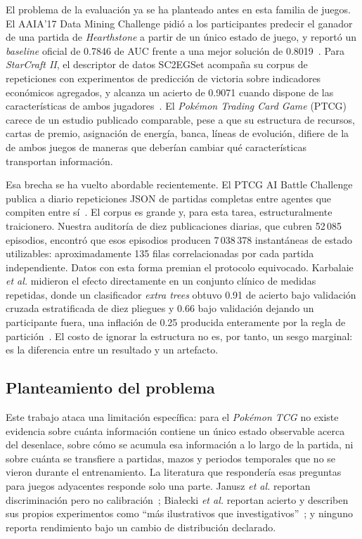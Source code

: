 \documentclass[conference]{IEEEtran}
\begin{document}
El problema de la evaluaci\'on ya se ha planteado antes en esta familia de
juegos. El AAIA'17 Data Mining Challenge pidi\'o a los participantes
predecir el ganador de una partida de \emph{Hearthstone} a partir de un
\'unico estado de juego, y report\'o un \emph{baseline} oficial de 0.7846
de AUC frente a una mejor soluci\'on de
0.8019~\cite{janusz_hearthstone_2017}. Para \emph{StarCraft II}, el
descriptor de datos SC2EGSet acompa\~na su corpus de repeticiones con
experimentos de predicci\'on de victoria sobre indicadores econ\'omicos
agregados, y alcanza un acierto de 0.9071 cuando dispone de las
caracter\'isticas de ambos jugadores~\cite{bialecki_sc2egset_2023}. El
\emph{Pok\'emon Trading Card Game} (PTCG) carece de un estudio publicado
comparable, pese a que su estructura de recursos, cartas de premio,
asignaci\'on de energ\'ia, banca, l\'ineas de evoluci\'on, difiere de la
de ambos juegos de maneras que deber\'ian cambiar qu\'e caracter\'isticas
transportan informaci\'on.

Esa brecha se ha vuelto abordable recientemente. El PTCG AI Battle
Challenge publica a diario repeticiones JSON de partidas completas entre
agentes que compiten entre s\'i~\cite{ptcg_dataset_2026}. El corpus es
grande y, para esta tarea, estructuralmente traicionero. Nuestra
auditor\'ia de diez publicaciones diarias, que cubren 52\,085 episodios,
encontr\'o que esos episodios producen 7\,038\,378 instant\'aneas de
estado utilizables: aproximadamente 135 filas correlacionadas por cada
partida independiente. Datos con esta forma premian el protocolo
equivocado. Karbalaie \textit{et al.} midieron el efecto directamente en un
conjunto cl\'inico de medidas repetidas, donde un clasificador
\emph{extra trees} obtuvo 0.91 de acierto bajo validaci\'on cruzada
estratificada de diez pliegues y 0.66 bajo validaci\'on dejando un
participante fuera, una inflaci\'on de 0.25 producida enteramente por la
regla de partici\'on~\cite{karbalaie_participantaware_2026}. El costo de
ignorar la estructura no es, por tanto, un sesgo marginal: es la diferencia
entre un resultado y un artefacto.

\subsection{Planteamiento del problema}
\label{subsec:problem}

Este trabajo ataca una limitaci\'on espec\'ifica: para el \emph{Pok\'emon
TCG} no existe evidencia sobre cu\'anta informaci\'on contiene un \'unico
estado observable acerca del desenlace, sobre c\'omo se acumula esa
informaci\'on a lo largo de la partida, ni sobre cu\'anta se transfiere a
partidas, mazos y periodos temporales que no se vieron durante el
entrenamiento. La literatura que responder\'ia esas preguntas para juegos
adyacentes responde solo una parte. Janusz \textit{et al.} reportan
discriminaci\'on pero no calibraci\'on~\cite{janusz_hearthstone_2017};
Bia\l ecki \textit{et al.} reportan acierto y describen sus propios
experimentos como ``m\'as ilustrativos que
investigativos''~\cite{bialecki_sc2egset_2023}; y ninguno reporta
rendimiento bajo un cambio de distribuci\'on declarado.
\end{document}

